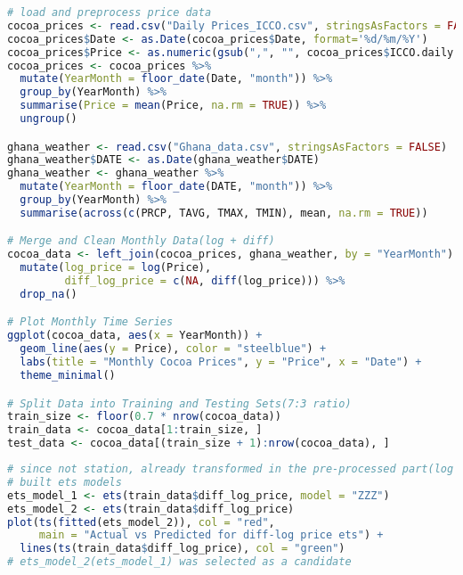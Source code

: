 \documentclass[10pt]{article}
\begin{document}
\begin{lstlisting}[language=R, caption=Data]
# load and preprocess price data
cocoa_prices <- read.csv("Daily Prices_ICCO.csv", stringsAsFactors = FALSE)
cocoa_prices$Date <- as.Date(cocoa_prices$Date, format='%d/%m/%Y')
cocoa_prices$Price <- as.numeric(gsub(",", "", cocoa_prices$ICCO.daily.price..US..tonne.))
cocoa_prices <- cocoa_prices %>%
  mutate(YearMonth = floor_date(Date, "month")) %>%
  group_by(YearMonth) %>%
  summarise(Price = mean(Price, na.rm = TRUE)) %>%
  ungroup()

ghana_weather <- read.csv("Ghana_data.csv", stringsAsFactors = FALSE)
ghana_weather$DATE <- as.Date(ghana_weather$DATE)
ghana_weather <- ghana_weather %>%
  mutate(YearMonth = floor_date(DATE, "month")) %>%
  group_by(YearMonth) %>%
  summarise(across(c(PRCP, TAVG, TMAX, TMIN), mean, na.rm = TRUE))

# Merge and Clean Monthly Data(log + diff)
cocoa_data <- left_join(cocoa_prices, ghana_weather, by = "YearMonth") %>%
  mutate(log_price = log(Price),
         diff_log_price = c(NA, diff(log_price))) %>%
  drop_na()

# Plot Monthly Time Series
ggplot(cocoa_data, aes(x = YearMonth)) +
  geom_line(aes(y = Price), color = "steelblue") +
  labs(title = "Monthly Cocoa Prices", y = "Price", x = "Date") +
  theme_minimal()

# Split Data into Training and Testing Sets(7:3 ratio)
train_size <- floor(0.7 * nrow(cocoa_data))
train_data <- cocoa_data[1:train_size, ]
test_data <- cocoa_data[(train_size + 1):nrow(cocoa_data), ]
\end{lstlisting}

\begin{lstlisting}[language=R, caption=ETS Model]
# since not station, already transformed in the pre-processed part(log + diff)
# built ets models
ets_model_1 <- ets(train_data$diff_log_price, model = "ZZZ")
ets_model_2 <- ets(train_data$diff_log_price)
plot(ts(fitted(ets_model_2)), col = "red", 
     main = "Actual vs Predicted for diff-log price ets") + 
  lines(ts(train_data$diff_log_price), col = "green")
# ets_model_2(ets_model_1) was selected as a candidate
\end{lstlisting}
\end{document}

